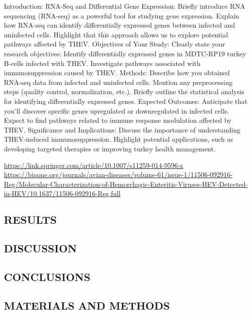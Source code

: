 \documentclass[
]{article}
\begin{document}
Introduction: RNA-Seq and Differential Gene Expression: Briefly
introduce RNA sequencing (RNA-seq) as a powerful tool for studying gene
expression. Explain how RNA-seq can identify differentially expressed
genes between infected and uninfected cells. Highlight that this
approach allows us to explore potential pathways affected by THEV.
Objectives of Your Study: Clearly state your research objectives:
Identify differentially expressed genes in MDTC-RP19 turkey B-cells
infected with THEV. Investigate pathways associated with
immunosuppression caused by THEV. Methods: Describe how you obtained
RNA-seq data from infected and uninfected cells. Mention any
preprocessing steps (quality control, normalization, etc.). Briefly
outline the statistical analysis for identifying differentially
expressed genes. Expected Outcomes: Anticipate that you'll discover
specific genes upregulated or downregulated in infected cells. Expect to
find pathways related to immune response modulation affected by THEV.
Significance and Implications: Discuss the importance of understanding
THEV-induced immunosuppression. Highlight potential applications, such
as developing targeted therapies or improving turkey health management.

\url{https://link.springer.com/article/10.1007/s11259-014-9596-z}
\url{https://bioone.org/journals/avian-diseases/volume-61/issue-1/11506-092916-Reg/Molecular-Characterization-of-Hemorrhagic-Enteritis-Viruses-HEV-Detected-in-HEV/10.1637/11506-092916-Reg.full}
\newpage

\subsection{RESULTS}\label{results}

\newpage

\subsection{DISCUSSION}\label{discussion}

\newpage

\subsection{CONCLUSIONS}\label{conclusions}

\newpage

\subsection{MATERIALS AND METHODS}\label{materials-and-methods}
\end{document}
